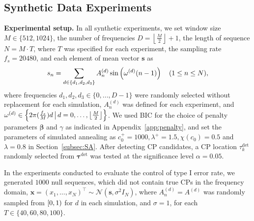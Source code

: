 \subsection{Synthetic Data Experiments}
\label{subsec:Synthetic_Data_Experiments}
\textbf{Experimental setup.}
In all synthetic experiments, we set window size $M \in \{512, 1024\}$, 
the number of frequencies $D = \left\lfloor\frac{M}{2} \right\rfloor + 1$, 
the length of sequence $N = M \cdot T$, where $T$ was specified for each experiment, 
the sampling rate $f_s = 20480$, 
and each element of mean vector $\bm{s}$ as 
\begin{equation}
  s_n = \sum_{d \in \{d_1, d_2, d_3\}} A_n^{(d)} \sin\left(\omega^{(d)}(n-1)\right) ~~~ (1 \leq n \leq N), \notag
\end{equation}
where frequencies $d_1, d_2, d_3 \in \{0, ..., D-1\}$ were randomly selected without replacement for each simulation, %
$A_n^{(d)}$ was defined for each experiment, 
and $\omega^{(d)} \in \left\{2 \pi (\frac{f_s}{M}) d \, \big{|} \, d = 0, \dots, \left\lfloor\frac{M}{2} \right\rfloor\right\}$.
We used BIC for the choice of penalty parameters $\bm{\beta}$ and $\gamma$ as indicated in Appendix~\ref{app:penalty}, 
and set the parameters of simulated annealing as $c_0^+=1000, \lambda^+=1.5, \chi(c_0)=0.5$ and $\lambda=0.8$ in Section~\ref{subsec:SA}. 
After detecting CP candidates, a CP location $\tau_k^{\text{det}}$ randomly selected from $\bm{\tau}^{\text{det}}$ was tested at the significance level $\alpha = 0.05$.

In the experiments conducted to evaluate the control of type I error rate, 
we generated $1000$ null sequences, which did not contain true CPs in the frequency domain, $\bm{x}=(x_1, \dots, x_N)^\top \sim \mathcal{N}\left(\bm{s}, \sigma^2 I_N\right)$, where $A_n^{(d)} = A^{(d)}$ 
was randomly sampled from $[0,1)$ for $d$ in each simulation, 
and $\sigma=1$, for each $T \in \{40, 60, 80, 100\}$.

